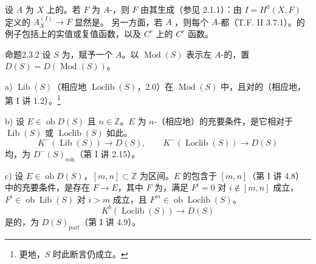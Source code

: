 设 $A$ 为 $X$ 上的。若 $F$ 为 $A$-，则 $F$ 由其生成（参见 2.1.1）：由 $I=H^0(X,F)$ 定义的 $A_X^{(I)}\to F$ 显然是。
另一方面，若 $A$ ，则每个 $A$-都（T.F. II 3.7.1）。的例子包括上的实值或复值函数，以及 $C^r$ 上的 $C^r$ 函数。
\begin{SGAresult}{命题}{2.3.2}
设 $S$ 为，赋予一个 $A$。以 $\operatorname{Mod}(S)$ 表示左 $A$-的，置 $D(S)=D(\operatorname{Mod}(S))$。

a) $\operatorname{Lib}(S)$（相应地 $\operatorname{Loclib}(S)$，2.0）在 $\operatorname{Mod}(S)$ 中，且对的（相应地，第 I 讲 1.2）。\footnote{更地，$S$ 时此断言仍成立。}

b) 设 $E\in\operatorname{ob}D(S)$ 且 $n\in\mathbb Z$。$E$ 为 $n$-（相应地）的充要条件，是它相对于 $\operatorname{Lib}(S)$ 或 $\operatorname{Loclib}(S)$ 如此。
\[
K^-(\operatorname{Lib}(S))\longrightarrow D(S),\qquad
K^-(\operatorname{Loclib}(S))\longrightarrow D(S)
\]
均，为 $D^-(S)_{\mathrm{coh}}$（第 I 讲 2.15）。

c) 设 $E\in\operatorname{ob}D(S)$，$[m,n]\subset\mathbb Z$ 为区间。$E$ 的包含于 $[m,n]$（第 I 讲 4.8）中的充要条件，是存在 $F\to E$，其中 $F$ 为，满足 $F^i=0$ 对 $i\notin[m,n]$ 成立，$F^i\in\operatorname{ob}\operatorname{Lib}(S)$ 对 $i>m$ 成立，且 $F^m\in\operatorname{ob}\operatorname{Loclib}(S)$。
\[
K^b(\operatorname{Loclib}(S))\longrightarrow D(S)
\]
是的，为 $D(S)_{\mathrm{parf}}$（第 I 讲 4.9）。


\end{SGAresult}
